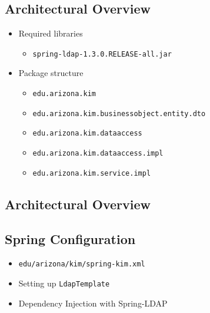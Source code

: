 \documentclass[12pt,notitlepage]{article}
\begin{document}
\begin{s5presentation}
  \W \begin{s5slide}
    \W \section{Architectural Overview}
    \begin{itemize}
    \item Required libraries
      \begin{itemize}
        \item \verb|spring-ldap-1.3.0.RELEASE-all.jar|
      \end{itemize}
    \item Package structure
      \begin{itemize}
      \item \verb|edu.arizona.kim|
      \item \verb|edu.arizona.kim.businessobject.entity.dto|
      \item \verb|edu.arizona.kim.dataaccess|
      \item \verb|edu.arizona.kim.dataaccess.impl|
      \item \verb|edu.arizona.kim.service.impl|
      \end{itemize}
    \end{itemize}
    \W \end {s5slide}
  \W \begin{s5slide}
    \section{Architectural Overview}
    \W \end{s5slide}
  
  \W \begin{s5slide}
    \W \section{Spring Configuration}
    \begin{itemize}
      \item \verb|edu/arizona/kim/spring-kim.xml|
      \item Setting up \verb|LdapTemplate|
      \item Dependency Injection with Spring-LDAP
    \end{itemize}
    \W \end {s5slide}


\end{s5presentation}
\end{document}
